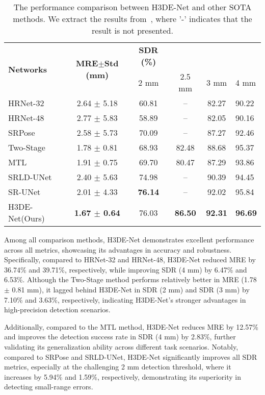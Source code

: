 \begin{table*}[htbp]
\centering
\small
\caption{The performance comparison between H3DE-Net and other SOTA methods. We extract the results from~\cite{3D-CNN2-sr}, where '-' indicates that the result is not presented.}
\renewcommand{\arraystretch}{1}
\setlength{\extrarowheight}{1.1pt} %
\resizebox{0.8\linewidth}{!}
{
\begin{tabular}{lccccl}
\hline
\multirow{2}{*}{\textbf{Networks}}  &  \multirow{2}{*}{\textbf{MRE$\pm$Std (mm)} } & \textbf{SDR (\%)} \\ 
\cmidrule{3-6}
& & 2 mm & 2.5 mm & 3 mm & 4 mm \\ \hline
HRNet-32 \cite{HRnet}   & 2.64 $\pm$ 5.18  & 60.81& -- &82.27 & 90.22 \\  
HRNet-48 \cite{HRnet}   & 2.77 $\pm$ 5.83  & 58.89& -- &82.05 & 90.16 \\  
SRPose \cite{SRpose}   & 2.58 $\pm$ 5.73  & 70.09& -- &87.27 & 92.46 \\ 
Two-Stage \cite{HE202115}   & 1.78 $\pm$ 0.81  &68.93& 82.48 &88.68 &95.37 \\
MTL \cite{Zhang2019ContextguidedFC}   & 1.91 $\pm$ 0.75  & 69.70& 80.47 &87.29 & 93.86\\
SRLD-UNet \cite{3D-CNN2-sr}   & 2.40 $\pm$ 5.63  & 74.98& -- &90.39 & 94.45 \\ 
SR-UNet \cite{3D-CNN2-sr}   & 2.01 $\pm$ 4.33  & \textbf{76.14}& -- &92.02 & 95.84 \\  
H3DE-Net(Ours)   & \textbf{1.67 $\pm$ 0.64 }& 76.03&\textbf{ 86.50 }&\textbf{92.31} & \textbf{96.69} \\  
\bottomrule
\end{tabular}
}
\label{tab:tab2}
\end{table*}

Among all comparison methods, H3DE-Net demonstrates excellent performance across all metrics, showcasing its advantages in accuracy and robustness. Specifically, compared to HRNet-32 and HRNet-48, H3DE-Net reduced MRE by 36.74\% and 39.71\%, respectively, while improving SDR (4 mm) by 6.47\% and 6.53\%. Although the Two-Stage method performs relatively better in MRE (1.78 $\pm$ 0.81 mm), it lagged behind H3DE-Net in SDR (2 mm) and SDR (3 mm) by 7.10\% and 3.63\%, respectively, indicating H3DE-Net's stronger advantages in high-precision detection scenarios. 

Additionally, compared to the MTL method, H3DE-Net reduces MRE by 12.57\% and improves the detection success rate in SDR (4 mm) by 2.83\%, further validating its generalization ability across different task scenarios. Notably, compared to SRPose and SRLD-UNet, H3DE-Net significantly improves all SDR metrics, especially at the challenging 2 mm detection threshold, where it increases by 5.94\% and 1.59\%, respectively, demonstrating its superiority in detecting small-range errors.

